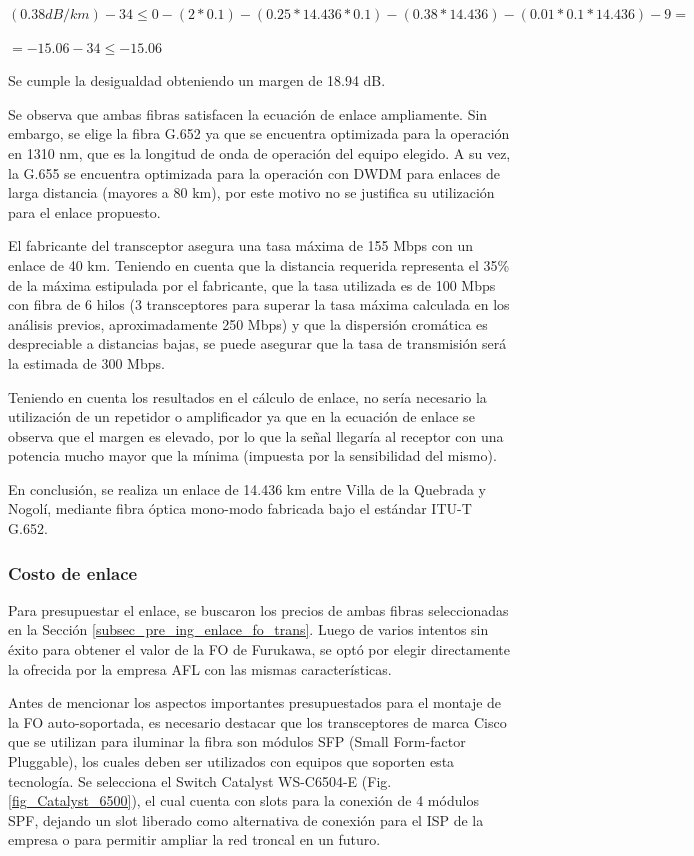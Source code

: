 \documentclass[12pt,a4paper]{book}
\begin{document}
\medskip

\noindent $(0.38 dB/km) -34 \leq 0-(2*0.1)-(0.25*14.436*0.1)-(0.38*14.436)-(0.01*0.1*14.436)-9=$

\noindent\begin{center}
$=-15.06-34 \leq -15.06$
\end{center}

Se cumple la desigualdad obteniendo un margen de 18.94 dB.

Se observa que ambas fibras satisfacen la ecuación de enlace ampliamente. Sin embargo, se elige la fibra G.652 ya que se encuentra optimizada para la operación en 1310 nm, que es la longitud de onda de operación del equipo elegido. A su vez, la G.655 se encuentra optimizada para la operación con DWDM para enlaces de larga distancia (mayores a 80 km), por este motivo no se justifica su utilización para el enlace propuesto.

El fabricante del transceptor asegura una tasa máxima de 155 Mbps con un enlace de 40 km. Teniendo en cuenta que la distancia requerida representa el 35\% de la máxima estipulada por el fabricante, que la tasa utilizada es de 100 Mbps con fibra de 6 hilos (3 transceptores para superar la tasa máxima calculada en los análisis previos, aproximadamente 250 Mbps) y que la dispersión cromática es despreciable a distancias bajas, se puede asegurar que la tasa de transmisión será la estimada de 300 Mbps.

Teniendo en cuenta los resultados en el cálculo de enlace, no sería necesario la utilización de un repetidor o amplificador ya que en la ecuación de enlace se observa que el margen es elevado, por lo que la señal llegaría al receptor con una potencia mucho mayor que la mínima (impuesta por la sensibilidad del mismo).

En conclusión, se realiza un enlace de 14.436 km entre Villa de la Quebrada y Nogolí, mediante fibra óptica mono-modo fabricada bajo el estándar ITU-T G.652.

\subsubsection{Costo de enlace}
Para presupuestar el enlace, se buscaron los precios de ambas fibras seleccionadas en la Sección \ref{subsec_pre_ing_enlace_fo_trans}. Luego de varios intentos sin éxito para obtener el valor de la FO de Furukawa, se optó por elegir directamente la ofrecida por la empresa AFL con las mismas características.

Antes de mencionar los aspectos importantes presupuestados para el montaje de la FO auto-soportada, es necesario destacar que los transceptores de marca Cisco que se utilizan para iluminar la fibra son módulos SFP (Small Form-factor Pluggable), los cuales deben ser utilizados con equipos que soporten esta tecnología. Se selecciona el Switch Catalyst WS-C6504-E (Fig. \ref{fig_Catalyst_6500}), el cual cuenta con slots para la conexión de 4 módulos SPF, dejando un slot liberado como alternativa de conexión para el ISP de la empresa o para permitir ampliar la red troncal en un futuro.
\end{document}
